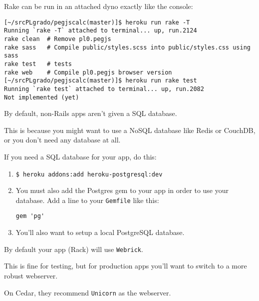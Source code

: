 
Rake can be run in an attached dyno exactly like the console:
\begin{verbatim}
[~/srcPLgrado/pegjscalc(master)]$ heroku run rake -T
Running `rake -T` attached to terminal... up, run.2124
rake clean  # Remove pl0.pegjs
rake sass   # Compile public/styles.scss into public/styles.css using sass
rake test   # tests
rake web    # Compile pl0.pegjs browser version
[~/srcPLgrado/pegjscalc(master)]$ heroku run rake test
Running `rake test` attached to terminal... up, run.2082
Not implemented (yet)
\end{verbatim}


By default, non-Rails apps aren’t given a SQL database. 

This is
because you might want to use a NoSQL database like 
Redis or CouchDB,
or you don’t need any
database at all. 

If you need a SQL database for your app, do this:
\begin{enumerate}
\item 
\begin{verbatim}
$ heroku addons:add heroku-postgresql:dev
\end{verbatim}
\item 
You must also add the Postgres gem to your app in order to use your
database. Add a line to your \verb|Gemfile| like this:
\begin{verbatim}
gem 'pg'
\end{verbatim}
\item 
You’ll also want to setup a local PostgreSQL database.
\end{enumerate}


By default your app (Rack) will use \verb|Webrick|. 

This is fine for
testing, but for production apps you’ll want to switch to a more
robust webserver. 

On Cedar, they  recommend \verb|Unicorn| as the webserver.


